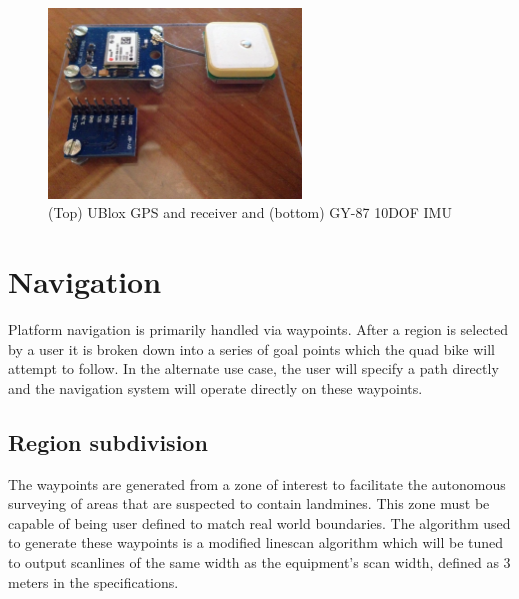 \documentclass[main.tex]{subfiles}
\begin{document}
\begin{figure}[ht]
\includegraphics[width=0.6\textwidth]{4-DetailedDesign/Positioning.jpg}
\centering
\caption{(Top) UBlox GPS and receiver and (bottom) GY-87 10DOF IMU} 
\end{figure}

\section{Navigation}
Platform navigation is primarily handled via waypoints. After a region is selected by a user it is broken down into a series of goal points which the quad bike will attempt to follow. In the alternate use case, the user will specify a path directly and the navigation system will operate directly on these waypoints.

\subsection{Region subdivision}
The waypoints are generated from a zone of interest to facilitate the autonomous surveying of areas that are suspected to contain landmines. This zone must be capable of being user defined to match real world boundaries. The algorithm used to generate these waypoints is a modified linescan algorithm which will be tuned to output scanlines of the same width as the equipment's scan width, defined as 3 meters in the specifications.
\end{document}
